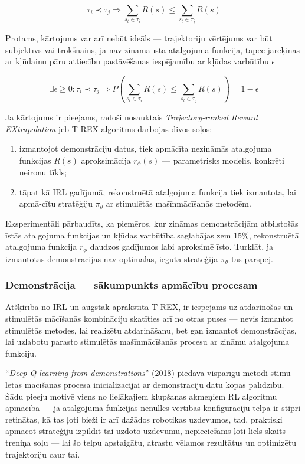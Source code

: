 \documentclass[12pt, a4paper]{article}
\numberwithin{equation}{section} %
\begin{document}
\begin{equation}
    \tau_i \prec \tau_j \Rightarrow \sum_{s_t \in \tau_i}R(s) \leq \sum_{s_t \in \tau_j}R(s)
\end{equation}

Protams, kārtojums var arī nebūt ideāls --- trajektoriju vērtējums var būt subjektīvs vai trokšņains, ja nav zināma īstā atalgojuma funkcija, tāpēc jārēķinās ar kļūdainu pāru attiecību pastāvēšanas iespējamību ar kļūdas varbūtību $\epsilon$

\begin{equation}
    \exists \epsilon \geq 0 : \tau_i \prec \tau_j \Rightarrow P\left(\sum_{s_t \in \tau_i}R(s) \leq \sum_{s_t \in \tau_j}R(s)\right) = 1 - \epsilon
\end{equation}

Ja kārtojums ir pieejams, radoši nosauktais \textit{Trajectory-ranked Reward EXtrapolation} jeb T-REX algoritms darbojas divos soļos:

\begin{enumerate}
    \item izmantojot demonstrāciju datus, tiek apmācīta nezināmās atalgojuma funkcijas $R(s)$ aproksimācija $r_{\phi}(s)$ --- parametrisks modelis, konkrēti neironu tīkls;
    \item tāpat kā IRL gadījumā, rekonstruētā atalgojuma funkcija tiek izmantota, lai apmā-cītu stratēģiju $\pi_{\theta}$ ar stimulētās mašīnmācīšanās metodēm.
\end{enumerate}

Eksperimentāli pārbaudīts, ka piemēros, kur zināmas demonstrācijām atbilstošās īstās atalgojuma funkcijas un kļūdas varbūtība saglabājas zem 15\%, rekonstruētā atalgojuma funkcija $r_{\phi}$ daudzos gadījumos labi aproksimē īsto. Turklāt, ja izmantotās demonstrācijas nav optimālas, iegūtā stratēģija $\pi_{\theta}$ tās pārspēj.

\subsubsection{Demonstrācija --- sākumpunkts apmācību procesam}

Atšķirībā no IRL un augstāk aprakstītā T-REX, ir iespējams uz atdarinošās un stimulētās mācīšanās kombināciju skatīties arī no otras puses --- nevis izmantot stimulētās metodes, lai realizētu atdarināšanu, bet gan izmantot demonstrācijas, lai uzlabotu parasto stimulētās mašīnmācīšanās procesu ar zināmu atalgojuma funkciju.

``\textit{Deep Q-learning from demonstrations}'' \cite{hester2018deep} (2018) piedāvā vispārīgu metodi stimu-lētās mācīšanās procesa inicializācijai ar demonstrāciju datu kopas palīdzību. Šādu pieeju motivē viens no lielākajiem klupšanas akmeņiem RL algoritmu apmācībā --- ja atalgojuma funkcijas nenulles vērtības konfigurāciju telpā ir stipri retinātas, kā tas ļoti bieži ir arī dažādos robotikas uzdevumos, tad, praktiski apmācot stratēģiju izpildīt tai uzdoto uzdevumu, nepieciešams ļoti liels skaits treniņa soļu --- lai šo telpu apstaigātu, atrastu vēlamos rezultātus un optimizētu trajektoriju caur tai.
\end{document}
